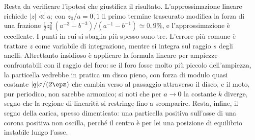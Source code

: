 \documentclass[main.tex]{subfiles}
\begin{document}
Resta da verificare l'ipotesi che giustifica il risultato. L'approssimazione lineare richiede $|z|\ll a$; con $z_0/a=0{,}1$ il primo termine trascurato modifica la forza di una frazione $\tfrac12z_0^2\,(a^{-3}-b^{-3})/(a^{-1}-b^{-1})\simeq0{,}9\%$, e l'approssimazione è eccellente. I punti in cui si sbaglia più spesso sono tre. L'errore più comune è trattare $z$ come variabile di integrazione, mentre si integra sul raggio $s$ degli anelli. Altrettanto insidioso è applicare la formula lineare per ampiezze confrontabili con il raggio del foro: se il foro fosse molto più piccolo dell'ampiezza, la particella vedrebbe in pratica un disco pieno, con forza di modulo quasi costante $|q|\sigma/(2\epz)$ che cambia verso al passaggio attraverso il disco, e il moto, pur periodico, non sarebbe armonico; si noti che per $a\to0$ la costante $k$ diverge, segno che la regione di linearità si restringe fino a scomparire. Resta, infine, il segno della carica, spesso dimenticato: una particella positiva sull'asse di una corona positiva non oscilla, perché il centro è per lei una posizione di equilibrio instabile lungo l'asse.
\end{document}

